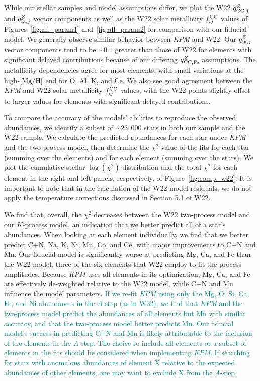 \documentclass[modern]{aastex631}
\newcommand{\mgh}{[{\rm Mg}/{\rm H}]}
\newcommand{\qcc}{q_{{\rm CC,}j}^{Z}}
\newcommand{\qccFe}{q_{{\rm CC, Fe}}^{Z}}
\newcommand{\qIa}{q_{{\rm Ia,}j}^{Z}}
\newcommand{\fcc}{f_{ij}^{\rm CC}}
\newcommand{\add}[1]{\textcolor{teal}{#1}}
\newcommand{\name}{\textsl{KPM}}
\begin{document}
While our stellar samples and model assumptions differ, we plot the W22 $\qcc$ and $\qIa$ vector components as well as the W22 solar metallicity $\fcc$ values of Figures~\ref{fig:all_param1} and~\ref{fig:all_param2} for comparison with our fiducial model. We generally observe similar behavior between \name{} and W22. Our $\qIa$ vector components tend to be $\sim 0.1$ greater than those of W22 for elements with significant delayed contributions because of our differing $\qccFe$ assumptions. The metallicity dependencies agree for most elements, with small variations at the high-$\mgh$ end for O, Al, K, and Ce. We also see good agreement between the \name{} and W22 solar metallicity $\fcc$ values, with the W22 points slightly offset to larger values for elements with significant delayed contributions.

To compare the accuracy of the models' abilities to reproduce the observed abundances, we identify a subset of $\sim 23,000$ stars in both our sample and the W22 sample. We calculate the predicted abundances for each star under \name{} and the two-process model, then determine the $\chi^2$ value of the fits for each star (summing over the elements) and for each element (summing over the stars). We plot the cumulative stellar $\log(\chi^2)$ distribution and the total $\chi^2$ for each element in the right and left panels, respectively, of Figure~\ref{fig:comp_w22}. It is important to note that in the calculation of the W22 model residuals, we do not apply the temperature corrections discussed in Section 5.1 of W22. 

We find that, overall, the $\chi^2$ decreases between the W22 two-process model and our $K$-process model, an indication that we better predict all of a star's abundances. When looking at each element individually, we find that we better predict C+N, Na, K, Ni, Mn, Co, and Ce, with major improvements to C+N and Mn. Our fiducial model is significantly worse at predicting Mg, Ca, and Fe than the W22 model, three of the six elements that W22 employ to fit the process amplitudes. Because \name{} uses all elements in its optimization, Mg, Ca, and Fe are effectively de-weighted relative to the W22 model, while C+N and Mn influence the model parameters. \add{If we re-fit \name{} using only the Mg, O, Si, Ca, Fe, and Ni abundances in the $A$-step (as in W22), we find that \name{} and the two-process model predict the abundances of all elements but Mn with similar accuracy, and that the two-process model better predicts Mn. Our fiducial model's success in predicting C+N and Mn is likely attributable to the inclusion of the elements in the $A$-step. The choice to include all elements or a subset of elements in the fits should be considered when implementing \name{}. If searching for stars with anomalous abundances of element X relative to the expected abundances of other elements, one may want to exclude X from the $A$-step.} 
\end{document}
